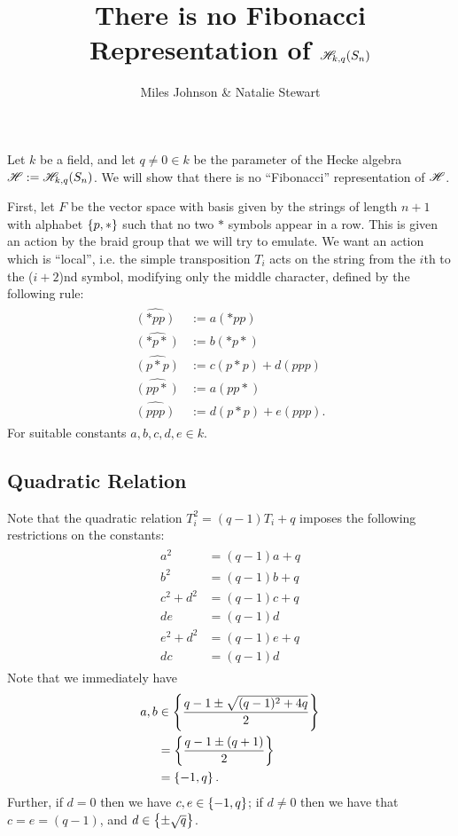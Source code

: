 \documentclass{amsart}
\begin{document}
\title{There is no Fibonacci Representation of $\mathscr{H}_{k,q}(S_{n})$}
\author{Miles Johnson \& Natalie Stewart}
\maketitle

Let $k$ be a field, and let $q \neq 0 \in k$ be the parameter of the Hecke algebra $\mathscr{H} := \mathscr{H}_{k,q}(S_n)$.
We will show that there is no ``Fibonacci'' representation of $\mathscr{H}$.

First, let $F$ be the vector space with basis given by the strings of length $n + 1$ with alphabet $\left\{ p,* \right\}$ such that no two $*$ symbols appear in a row.
This is given an action by the braid group that we will try to emulate.
We want an action which is ``local'', i.e. the simple transposition $T_i$ acts on the string from the $i$th to the ($i + 2$)nd symbol, modifying only the middle character, defined by the following rule:
\begin{align}
  \begin{split}
  \widehat{(*pp)} &:= a(*pp)\\
  \widehat{(*p*)} &:= b(*p*)\\
  \widehat{(p*p)} &:= c(p*p) + d(ppp)\\
  \widehat{(pp*)} &:= a(pp*)\\
  \widehat{(ppp)} &:= d(p*p) + e(ppp).
  \end{split}
  \label{Definitions}
\end{align}
For suitable constants $a,b,c,d,e \in k$.
\subsection*{Quadratic Relation}
Note that the quadratic relation $T_i^2 = (q -1)T_i + q$ imposes the following restrictions on the constants:
\begin{align}
  \begin{split}
  a^2 &= (q-1)a + q\\
  b^2 &= (q-1)b + q\\
  c^2 + d^2 &= (q -1)c + q\\
  de &= (q-1)d\\
  e^2 + d^2 &= (q -1)e + q\\
  dc &= (q-1)d
\end{split}
  \label{Quadratic}
\end{align}
Note that we immediately have
\begin{align}
  \begin{split}
  a,b &\in \left\{ \frac{q - 1 \pm \sqrt{(q-1)^2 + 4q}}{2} \right\}\\
  &= \left\{ \frac{q - 1 \pm (q + 1)}{2} \right\}\\
  &= \left\{ -1,q \right\}.
\end{split}
\label{ab}
\end{align}
Further, if $d = 0$ then we have $c,e \in \left\{ -1,q \right\}$;
if $d \neq 0$ then we have that $c = e = (q - 1)$, and $d \in \left\{ \pm \sqrt{q} \right\}$.
\end{document}
